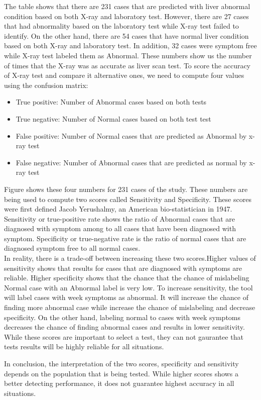 \documentclass[12pt]{article}
\begin{document}
The table shows that there are 231 cases that are predicted with liver abnormal condition based on both X-ray and laboratory test. However, there are 27 cases that had abnormality based on the laboratory test while X-ray test failed to identify. On the other hand, there are 54 cases that have normal liver condition based on both X-ray and laboratory test. In addition, 32 cases were symptom free while X-ray test labeled them as Abnormal. 
These numbers show us the number of times that the X-ray was as accurate as liver scan test. To score the accuracy of X-ray test and compare it alternative ones, we need to compute four values using the confusion matrix: 
\begin{itemize}
\item True positive: Number of Abnormal cases based on both tests 
\item True negative: Number of Normal cases based on both test test
\item False positive: Number of Normal cases that are predicted as Abnormal by x-ray test 
\item False negative: Number of Abnormal cases that are predicted as normal by x-ray test
\end{itemize}
Figure shows these four numbers for 231 cases of the study. These numbers are being used to compute two scores called Sensitivity and Specificity. These scores were first defined  Jacob Yerushalmy, an American bio-statistician in 1947. Sensitivity or true-positive rate shows the ratio of Abnormal cases that are diagnosed with symptom among to all cases that have been diagnosed with symptom. Specificity or true-negative rate is the ratio of normal cases that are diagnosed symptom free to all normal cases.\\
In reality, there is a trade-off between increasing these two scores.Higher values of sensitivity shows that results for cases that are diagnosed with symptoms are reliable. Higher specificity shows that the chance that the chance of mislabeling Normal case with an Abnormal label is very low. To increase sensitivity, the tool will label cases with week symptoms as abnormal. It will increase the chance of finding more abnormal case while increase the chance of mislabeling and decrease specificity. On the other hand, labeling normal to cases with week symptoms decreases the chance of finding abnormal cases and results in lower sensitivity.
While these scores are important to select a test, they can not gaurantee that tests results will be highly reliable for all situations. 

In conclusion, the interpretation of the two scores, specificity and sensitivity depends on the population that is being tested. While higher scores shows a better detecting performance, it does not guarantee highest accuracy in all situations. 
\end{document}
